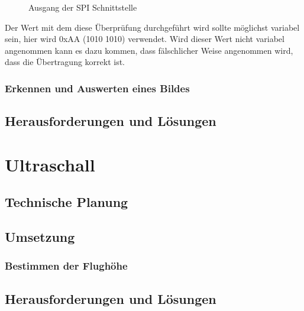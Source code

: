     \begin{figure}[tbh]
      \begin{centering}
      \par\end{centering}
      \caption{Ausgang der SPI Schnittstelle}
      \label{SPI-Ausgang}
    \end{figure}

    Der Wert mit dem diese Überprüfung durchgeführt wird sollte möglichst variabel sein, hier wird 0xAA (1010 1010) verwendet. Wird dieser Wert nicht variabel angenommen kann es dazu kommen, dass fälschlicher Weise angenommen wird, dass die Übertragung korrekt ist.

    \subsubsection{Erkennen und Auswerten eines Bildes}
    

  \subsection{Herausforderungen und Lösungen}

\section{Ultraschall}

  \subsection{Technische Planung}

  \subsection{Umsetzung}

    \subsubsection{Bestimmen der Flughöhe}

  \subsection{Herausforderungen und Lösungen}

